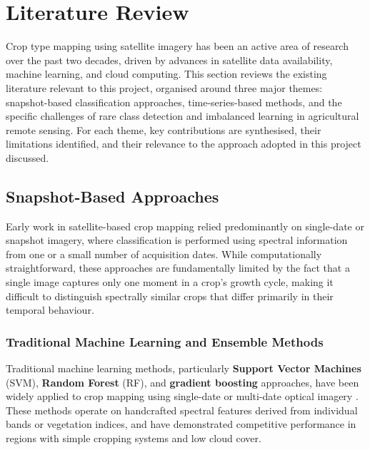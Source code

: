 \section{Literature Review}

Crop type mapping using satellite imagery has been an active 
area of research over the past two decades, driven by advances 
in satellite data availability, machine learning, and cloud 
computing. This section reviews the existing literature 
relevant to this project, organised around three major 
themes: snapshot-based classification approaches, 
time-series-based methods, and the specific challenges 
of rare class detection and imbalanced learning in 
agricultural remote sensing. For each theme, key 
contributions are synthesised, their limitations 
identified, and their relevance to the approach 
adopted in this project discussed.


  \subsection{Snapshot-Based Approaches}
  Early work in satellite-based crop mapping relied predominantly 
  on single-date or snapshot imagery, where classification is 
  performed using spectral information from one or a small number 
  of acquisition dates. While computationally straightforward, 
  these approaches are fundamentally limited by the fact that 
  a single image captures only one moment in a crop's growth 
  cycle, making it difficult to distinguish spectrally similar 
  crops that differ primarily in their temporal behaviour.

    \subsubsection{Traditional Machine Learning and Ensemble Methods}
    Traditional machine learning methods, particularly \textbf{Support 
    Vector Machines} (SVM), \textbf{Random Forest} (RF), and \textbf{gradient 
    boosting} approaches, have been widely applied to crop 
    mapping using single-date or multi-date optical imagery 
    \cite{mountrakis2011}. These methods operate on handcrafted 
    spectral features derived from individual bands or vegetation 
    indices, and have demonstrated competitive performance in 
    regions with simple cropping systems and low cloud cover.

